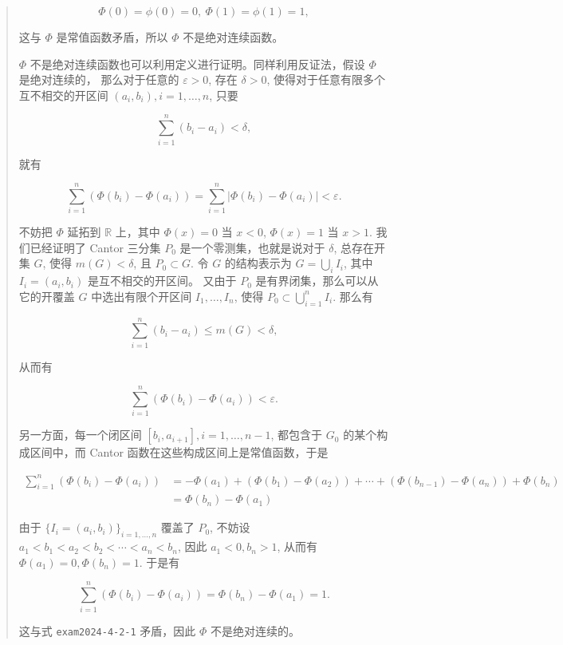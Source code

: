 \documentclass[
]{article}
\begin{document}
\begin{quote}
\[\Phi(0) = \phi(0) = 0, ~ \Phi(1) = \phi(1) = 1,\]

这与 \(\Phi\) 是常值函数矛盾，所以 \(\Phi\) 不是绝对连续函数。

\(\Phi\) 不是绝对连续函数也可以利用定义进行证明。同样利用反证法，假设
\(\Phi\) 是绝对连续的， 那么对于任意的 \(\varepsilon > 0\), 存在
\(\delta > 0\), 使得对于任意有限多个互不相交的开区间
\((a_i, b_i), i = 1, \dots, n\), 只要

\[\sum\limits_{i=1}^{n} (b_i - a_i) < \delta,\]

就有

\[\sum\limits_{i=1}^{n} (\Phi(b_i) - \Phi(a_i)) = \sum\limits_{i=1}^{n} \lvert \Phi(b_i) - \Phi(a_i) \rvert < \varepsilon.\]

不妨把 \(\Phi\) 延拓到 \(\mathbb{R}\) 上，其中 \(\Phi(x) = 0\) 当
\(x < 0\), \(\Phi(x) = 1\) 当 \(x > 1\). 我们已经证明了 Cantor 三分集
\(P_0\) 是一个零测集，也就是说对于 \(\delta\), 总存在开集 \(G\), 使得
\(m(G) < \delta\), 且 \(P_0 \subset G\). 令 \(G\) 的结构表示为
\(G = \bigcup\limits_{i} I_i\), 其中 \(I_i = (a_i, b_i)\)
是互不相交的开区间。 又由于 \(P_0\) 是有界闭集，那么可以从它的开覆盖
\(G\) 中选出有限个开区间 \(I_1, \dots, I_n\), 使得
\(P_0 \subset \bigcup\limits_{i=1}^{n} I_i\). 那么有

\[\sum\limits_{i=1}^{n} (b_i - a_i) \leqslant m(G) < \delta,\]

从而有

{\[\sum\limits_{i=1}^{n} (\Phi(b_i) - \Phi(a_i)) < \varepsilon.\]}

另一方面，每一个闭区间 \([b_i, a_{i+1}], i = 1, \dots, n-1\), 都包含于
\(G_0\) 的某个构成区间中，而 Cantor 函数在这些构成区间上是常值函数，于是

\[\begin{aligned}
\sum\limits_{i=1}^{n} (\Phi(b_i) - \Phi(a_i)) & = -\Phi(a_1) + (\Phi(b_1) - \Phi(a_2)) + \cdots + (\Phi(b_{n-1}) - \Phi(a_n)) + \Phi(b_n) \\
& = \Phi(b_n) - \Phi(a_1)
\end{aligned}\]

由于 \(\{I_i = (a_i, b_i)\}_{i = 1, \dots, n}\) 覆盖了 \(P_0\), 不妨设
\(a_1 < b_1 < a_2 < b_2 < \cdots < a_n < b_n\), 因此
\(a_1 < 0, b_n > 1\), 从而有 \(\Phi(a_1) = 0, \Phi(b_n) = 1\). 于是有

\[\sum\limits_{i=1}^{n} (\Phi(b_i) - \Phi(a_i)) = \Phi(b_n) - \Phi(a_1) = 1.\]

这与式 \texttt{exam2024-4-2-1} 矛盾，因此 \(\Phi\) 不是绝对连续的。
\end{quote}
\end{document}

